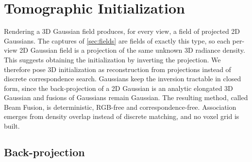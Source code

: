 \section{Tomographic Initialization}
\label{sec:tomography}

Rendering a 3D Gaussian field produces, for every view, a field of projected 2D
Gaussians.  The captures of \cref{sec:fields} are fields of exactly this type, so each
per-view 2D Gaussian field is a projection of the same unknown 3D radiance density.  This
suggests obtaining the initialization by inverting the projection.  We therefore pose 3D
initialization as reconstruction from projections instead of discrete correspondence
search.  Gaussians keep the inversion tractable in closed form, since the back-projection
of a 2D Gaussian is an analytic elongated 3D Gaussian and fusions of Gaussians remain
Gaussian.  The resulting method, called Beam Fusion, is deterministic, RGB-free and
correspondence-free.  Association emerges from density overlap instead of discrete
matching, and no voxel grid is built.

\subsection{Back-projection}
\label{sec:beams}

